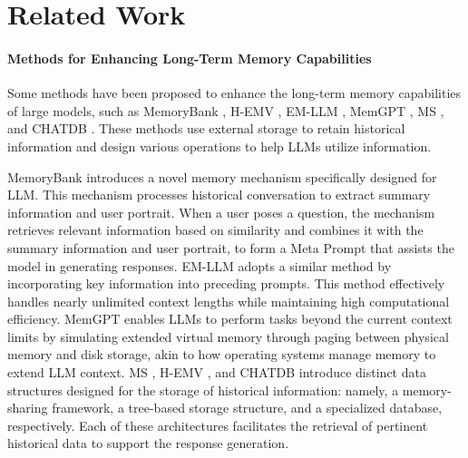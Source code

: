 \section{Related Work}
\label{sec:background}

\paragraph{Methods for Enhancing Long-Term Memory Capabilities}

Some methods have been proposed to enhance the long-term memory capabilities of large models, such as MemoryBank \cite{zhong2024memorybank}, H-EMV \cite{barmann2024episodic}, EM-LLM \cite{fountas2024human}, MemGPT \cite{packer2023memgpt}, MS \cite{gao2024memory}, and CHATDB \cite{hu2023chatdb}. These methods use external storage to retain historical information and design various operations to help LLMs utilize information.

MemoryBank \cite{zhong2024memorybank} introduces a novel memory mechanism specifically designed for LLM. This mechanism processes historical conversation to extract summary information and user portrait. When a user poses a question, the mechanism retrieves relevant information based on similarity and combines it with the summary information and user portrait, to form a Meta Prompt that assists the model in generating responses.
EM-LLM \cite{fountas2024human} adopts a similar method by incorporating key information into preceding prompts. This method effectively handles nearly unlimited context lengths while maintaining high computational efficiency.
MemGPT \cite{packer2023memgpt} enables LLMs to perform tasks beyond the current context limits by simulating extended virtual memory through paging between physical memory and disk storage, akin to how operating systems manage memory to extend LLM context.
MS \cite{gao2024memory}, H-EMV \cite{barmann2024episodic}, and CHATDB \cite{hu2023chatdb} introduce distinct data structures designed for the storage of historical information: namely, a memory-sharing framework, a tree-based storage structure, and a specialized database, respectively. Each of these architectures facilitates the retrieval of pertinent historical data to support the response generation.

